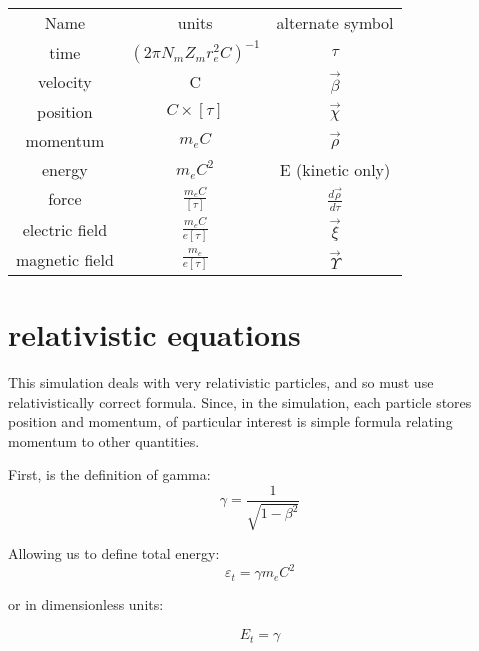 \documentclass[]{article}
\begin{document}
\begin{center}
	\begin{tabular}{ c c c }
		Name                 & units                             &   alternate symbol  \\ 
		time                 & $(2\pi N_m Z_m r^2_e C)^{-1}$     & $ \tau$    \\  
		velocity             & C                                 &  $\vec{\beta}$       \\  
		position             & $C\times \left[ \tau \right] $    & $ \vec{\chi} $     \\
		momentum             & $m_e C $                          &  $\vec{\rho} $     \\
		energy               & $m_e C^2 $                        &  E (kinetic only)      \\
		force                & $\frac{m_e C}{ \left[ \tau \right]} $     & $ \frac{d\vec{\rho}}{d\tau}$       \\
		electric field       & $\frac{m_e C}{ e \left[ \tau \right]} $   & $  \vec{\xi}  $   \\
		magnetic field       & $\frac{m_e }{ e \left[ \tau \right]} $    &  $ \vec{\Upsilon} $     \\
	\end{tabular}
\end{center}

\section{relativistic equations}

This simulation deals with very relativistic particles, and so must use relativistically correct formula. Since, in the simulation, each particle stores position and momentum, of particular interest is simple formula relating momentum to other quantities.

First, is the definition of gamma:
\begin{equation}
\gamma = \frac{1}{ \sqrt{1-\beta^2 } }
\end{equation}

Allowing us to define total energy:
\begin{equation}
\varepsilon_t = \gamma m_e C^2
\end{equation}

or in dimensionless units:

\begin{equation}
E_t = \gamma 
\end{equation}
\end{document}
